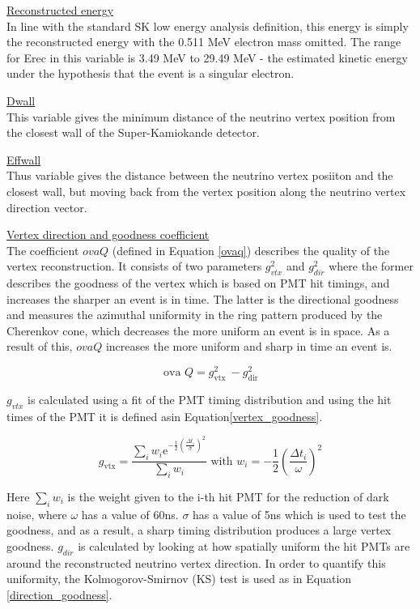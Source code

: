  \underline{Reconstructed energy}\\
 In line with the standard SK low energy analysis definition, this energy is simply the reconstructed energy with the 0.511 MeV electron mass omitted. The range for Erec in this variable is 3.49 MeV to 29.49 MeV - the estimated kinetic energy under the hypothesis that the event is a singular electron.
\newline

 \underline{Dwall}\\
 This variable gives the minimum distance of the neutrino vertex position from the closest wall of the Super-Kamiokande detector.
\newline

 \underline{Effwall}\\
 Thus variable gives the distance between the neutrino vertex posiiton and the closest wall, but moving back from the vertex position along the neutrino vertex direction vector.
\newline

 \underline{Vertex direction and goodness coefficient}\\
 The coefficient $ovaQ$ (defined in Equation \ref{ovaq}) describes the quality of the vertex reconstruction. It consists of two parameters $g^2_{vtx}$ and $g^2_{dir}$ where the former describes the goodness of the vertex which is based on PMT hit timings, and increases the sharper an event is in time. The latter is the directional goodness and measures the azimuthal uniformity in the ring pattern produced by the Cherenkov cone, which decreases the more uniform an event is in space. As a result of this, $ovaQ$ increases the more uniform and sharp in time an event is.

\begin{equation}
    \text { ova } Q=g_{\text {vtx }}^{2}-g_{\text {dir }}^{2}
    \label{ovaq}
\end{equation}

$g_{vtx}$ is calculated using a fit of the PMT timing distribution and using the hit times of the PMT it is defined asin Equation\ref{vertex_goodness}.

\begin{equation}
g_{\mathrm{vtx}}=\frac{\sum_{i} w_{i} \mathrm{e}^{-\frac{1}{2}(\frac{\Delta t_{i}}{\sigma})^{2}}}{\sum_{i} w_{i}} \text { with } w_{i}=-\frac{1}{2}(\frac{\Delta t_{i}}{\omega})^{2}
\label{vertex_goodness}
\end{equation}

Here $\sum_{i} w_{i}$ is the weight given to the i-th hit PMT for the reduction of dark noise, where $\omega$ has a value of 60ns. $\sigma$ has a value of 5ns which is used to test the goodness, and as a result, a sharp timing distribution produces a large vertex goodness. $g_{dir}$ is calculated by looking at how spatially uniform the hit PMTs are around the reconstructed neutrino vertex direction. In order to quantify this uniformity, the Kolmogorov-Smirnov (KS) test is used as in Equation \ref{direction_goodness}.

